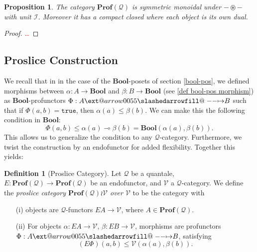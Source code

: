 \documentclass[12pt]{article}
\makeatletter
\theoremstyle{definition}
\newtheorem{definition}{Definition}[section]
\theoremstyle{plain}
\theoremstyle{plain}
\newtheorem{proposition}{Proposition}[section]
\theoremstyle{plain}
\theoremstyle{plain}
\theoremstyle{remark}
\theoremstyle{remark}
\newcommand{\mc}[1]{\mathcal{#1}}
\def\slashedarrowfill@#1#2#3#4#5{%
	$\m@th\thickmuskip0mu\medmuskip\thickmuskip\thinmuskip\thickmuskip
	\relax#5#1\mkern-7mu%
	\cleaders\hbox{$#5\mkern-2mu#2\mkern-2mu$}\hfill
	\mathclap{#3}\mathclap{#2}%
	\cleaders\hbox{$#5\mkern-2mu#2\mkern-2mu$}\hfill
	\mkern-7mu#4$%
}
\def\rightslashedarrowfill@{%
	\slashedarrowfill@\relbar\relbar\mapstochar\rightarrow}
\newcommand\xslashedrightarrow[2][]{%
	\ext@arrow 0055{\rightslashedarrowfill@}{#1}{#2}}
\makeatother
\begin{document}
\begin{proposition}
	The category $\mathbf{Prof}(\mc{Q})$ is symmetric monoidal under $- \circledast - $ with unit $\mc{I}$. Moreover it has a compact closed where each object is its own dual.
\end{proposition}
\begin{proof}
	\textcolor{red}{\ldots}
\end{proof}



\subsection{Proslice Construction}

We recall that in in the case of the $\mathbf{Bool}$-posets of section \ref{bool-pos}, we defined morphisms between $\alpha: A \rightarrow \mathbf{Bool}$ and $\beta: B \rightarrow \mathbf{Bool}$ (see \ref{def bool-pos morphism}) as $\mathbf{Bool}$-profunctors $\Phi: A \xslashedrightarrow{} B$ such that if $\Phi(a,b) = \mathtt{true}$, then $\alpha(a) \leq \beta(b)$. We can make this the following condition in $\mathbf{Bool}$: 
$$\Phi(a,b) \leq \alpha(a) \multimap \beta(b) = \mathbf{Bool}(\alpha(a), \beta(b)).$$
This allows us to generalize the condition to any $\mc{Q}$-category. Furthermore, we twist the construction by an endofunctor for added flexibility. Together this yields:

\begin{definition}[Proslice Category]
	Let $\mc{Q}$ be a quantale, $E: \mathbf{Prof}(\mc{Q}) \rightarrow \mathbf{Prof}(\mc{Q})$ be an endofunctor, and $\mc{V}$ a $\mc{Q}$-category. We define the \emph{proslice category $\mathbf{Prof}(\mc{Q}) \wr \mc{V}$ over $\mc{V}$} to be the category with
	\begin{itemize}
		\item[(i)] objects are $\mc{Q}$-functors $EA \rightarrow \mc{V}$, where $A \in \mathbf{Prof}(\mc{Q})$.
		\item[(ii)] For objects $\alpha: EA \rightarrow \mc{V}$, $\beta: EB \rightarrow \mc{V}$, morphisms are profunctors $\Phi: A \xslashedrightarrow{} B$, satisfying $$(E \Phi)(a,b) \leq \mc{V}(\alpha(a),\beta(b)).$$
	\end{itemize}
\end{definition}
\end{document}
